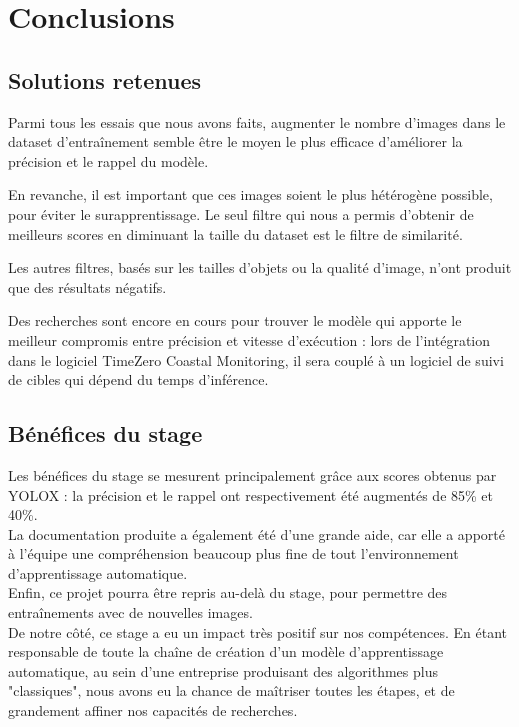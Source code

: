 \chapter{Conclusions}

\section{Solutions retenues}

Parmi tous les essais que nous avons faits, augmenter le nombre d'images dans le dataset 
d'entraînement semble être le moyen le plus efficace d'améliorer la précision et le 
rappel du modèle. 

En revanche, il est important que ces images soient le plus hétérogène possible, 
pour éviter le surapprentissage. Le seul filtre qui nous a permis d'obtenir de 
meilleurs scores en diminuant la taille du dataset est le filtre de similarité. 

Les autres filtres, basés sur les tailles d'objets ou la qualité d'image, 
n'ont produit que des résultats négatifs. 

Des recherches sont encore en cours pour trouver le modèle qui apporte 
le meilleur compromis entre précision et vitesse d'exécution : lors 
de l'intégration dans le logiciel TimeZero Coastal Monitoring, il sera couplé 
à un logiciel de suivi de cibles qui dépend du temps d'inférence. 

\section{Bénéfices du stage}

Les bénéfices du stage se mesurent principalement grâce aux scores obtenus 
par YOLOX : la précision et le rappel ont respectivement été augmentés de 85\%
et 40\%. \\

La documentation produite a également été d'une grande aide, car elle a apporté à l'équipe une compréhension 
beaucoup plus fine de tout l'environnement d'apprentissage automatique. \\

Enfin, ce projet pourra être repris au-delà du stage, pour permettre des 
entraînements avec de nouvelles images. \\

De notre côté, ce stage a eu un impact très positif sur nos compétences. 
En étant responsable de toute la chaîne de création d'un modèle d'apprentissage 
automatique, au sein d'une entreprise produisant des algorithmes plus "classiques", 
nous avons eu la chance de maîtriser toutes les étapes, et de grandement affiner
nos capacités de recherches.

